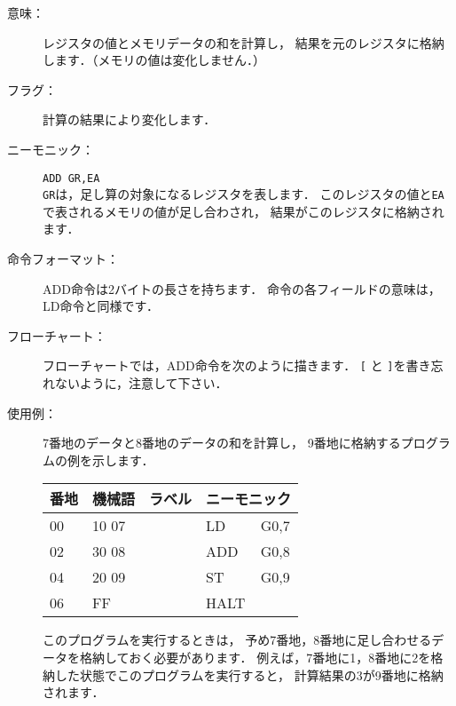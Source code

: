 \begin{description}
\item[意味：]レジスタの値とメモリデータの和を計算し，
結果を元のレジスタに格納します．（メモリの値は変化しません．）

\item[フラグ：]計算の結果により変化します．

\item[ニーモニック：]{\tt ADD  GR,EA} \\
{\tt GR}は，足し算の対象になるレジスタを表します．
このレジスタの値と{\tt EA}で表されるメモリの値が足し合わされ，
結果がこのレジスタに格納されます．

\item[命令フォーマット：]ADD命令は2バイトの長さを持ちます．
命令の各フィールドの意味は，LD命令と同様です．


\item[フローチャート：]フローチャートでは，ADD命令を次のように描きます．
{\tt [} と {\tt ]}を書き忘れないように，注意して下さい．

\begin{center}
\end{center}

\item[使用例：]
7番地のデータと8番地のデータの和を計算し，
9番地に格納するプログラムの例を示します．

{\tt\small\begin{center}
\begin{tabular}{|l|l|l|l l|} \hline
番地 & 機械語 & ラベル & \multicolumn{2}{|c|}{ニーモニック} \\
\hline
00 & 10 07 & & LD   & G0,7 \\
02 & 30 08 & & ADD  & G0,8 \\
04 & 20 09 & & ST   & G0,9 \\
06 & FF    & & HALT & \\
\hline
\end{tabular}
\end{center}}

このプログラムを実行するときは，
予め7番地，8番地に足し合わせるデータを格納しておく必要があります．
例えば，7番地に1，8番地に2を格納した状態でこのプログラムを実行すると，
計算結果の3が9番地に格納されます．
\end{description}

